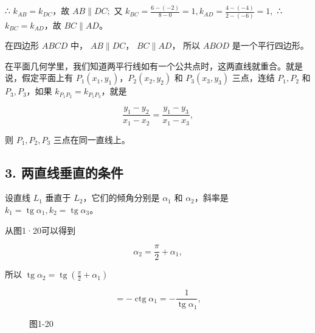 ∴ \(k_{AB}=k_{DC}\)，故 \(AB \parallel DC;\) 又
\(k_{BC} = \frac{6 - (-2)}{8 - 0} = 1, k_{AD} = \frac{4 - (-4)}{2 - (-6)} = 1,\)
∴ \(k_{BC}=k_{AD}\)，故 \(BC \parallel AD\)。

在四边形 \(ABCD\) 中， \(AB \parallel DC\)， \(BC \parallel AD\)， 所以
\(ABOD\) 是一个平行四边形。

在平面几何学里，我们知道两平行线如有一个公共点时，这两直线就重合。就是说，假定平面上有
\(P_{1}(x_{1},y_{1})\)，\(P_{2}(x_{2},y_{2})\) 和 \(P_{3}(x_{3},y_{3})\)
三点，连结 \(P_{1},P_{2}\) 和 \(P_{3},P_{3}\)，如果
\(k_{P_1P_2} = k_{P_1P_3}\)，就是

\[
\frac {y_{1} - y_{2}}{x_{1} - x_{2}} = \frac {y_{1} - y_{3}}{x_{1} - x_{3}},
\]

则 \(P_{1}, P_{2}, P_{3}\) 三点在同一直线上。

\subsection{3.
两直线垂直的条件}\label{ux4e24ux76f4ux7ebfux5782ux76f4ux7684ux6761ux4ef6}

设直线 \(L_{1}\) 垂直于 \(L_{2}\)，它们的倾角分别是 \(\alpha_{1}\) 和
\(\alpha_{2}\)，斜率是
\(k_{1} = \operatorname{tg}\alpha_{1}, k_{2} = \operatorname{tg}\alpha_{3}\)。

从图1·20可以得到

\[
\alpha_{2} = \frac {\pi}{2} + \alpha_{1},
\]

所以
\(\operatorname{tg} \alpha_{2} = \operatorname{tg}\left(\frac{\pi}{2} + \alpha_{1}\right)\)

\[
= - \operatorname{ctg} \alpha_{1} = - \frac {1}{\operatorname{tg} \alpha_{1}},
\]

\begin{figure}
\centering
{}
\caption{图1-20}
\end{figure}

